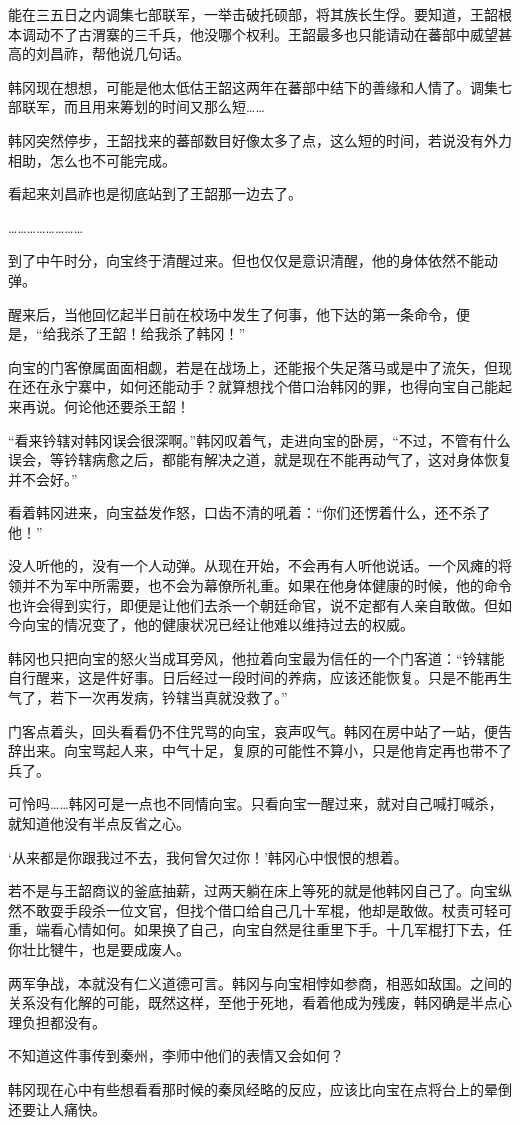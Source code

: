 能在三五日之内调集七部联军，一举击破托硕部，将其族长生俘。要知道，王韶根本调动不了古渭寨的三千兵，他没哪个权利。王韶最多也只能请动在蕃部中威望甚高的刘昌祚，帮他说几句话。

韩冈现在想想，可能是他太低估王韶这两年在蕃部中结下的善缘和人情了。调集七部联军，而且用来筹划的时间又那么短……

韩冈突然停步，王韶找来的蕃部数目好像太多了点，这么短的时间，若说没有外力相助，怎么也不可能完成。

看起来刘昌祚也是彻底站到了王韶那一边去了。

……………………

到了中午时分，向宝终于清醒过来。但也仅仅是意识清醒，他的身体依然不能动弹。

醒来后，当他回忆起半日前在校场中发生了何事，他下达的第一条命令，便是，“给我杀了王韶！给我杀了韩冈！”

向宝的门客僚属面面相觑，若是在战场上，还能报个失足落马或是中了流矢，但现在还在永宁寨中，如何还能动手？就算想找个借口治韩冈的罪，也得向宝自己能起来再说。何论他还要杀王韶！

“看来钤辖对韩冈误会很深啊。”韩冈叹着气，走进向宝的卧房，“不过，不管有什么误会，等钤辖病愈之后，都能有解决之道，就是现在不能再动气了，这对身体恢复并不会好。”

看着韩冈进来，向宝益发作怒，口齿不清的吼着：“你们还愣着什么，还不杀了他！”

没人听他的，没有一个人动弹。从现在开始，不会再有人听他说话。一个风瘫的将领并不为军中所需要，也不会为幕僚所礼重。如果在他身体健康的时候，他的命令也许会得到实行，即便是让他们去杀一个朝廷命官，说不定都有人亲自敢做。但如今向宝的情况变了，他的健康状况已经让他难以维持过去的权威。

韩冈也只把向宝的怒火当成耳旁风，他拉着向宝最为信任的一个门客道：“钤辖能自行醒来，这是件好事。日后经过一段时间的养病，应该还能恢复。只是不能再生气了，若下一次再发病，钤辖当真就没救了。”

门客点着头，回头看看仍不住咒骂的向宝，哀声叹气。韩冈在房中站了一站，便告辞出来。向宝骂起人来，中气十足，复原的可能性不算小，只是他肯定再也带不了兵了。

可怜吗……韩冈可是一点也不同情向宝。只看向宝一醒过来，就对自己喊打喊杀，就知道他没有半点反省之心。

‘从来都是你跟我过不去，我何曾欠过你！’韩冈心中恨恨的想着。

若不是与王韶商议的釜底抽薪，过两天躺在床上等死的就是他韩冈自己了。向宝纵然不敢耍手段杀一位文官，但找个借口给自己几十军棍，他却是敢做。杖责可轻可重，端看心情如何。如果换了自己，向宝自然是往重里下手。十几军棍打下去，任你壮比犍牛，也是要成废人。

两军争战，本就没有仁义道德可言。韩冈与向宝相悖如参商，相恶如敌国。之间的关系没有化解的可能，既然这样，至他于死地，看着他成为残废，韩冈确是半点心理负担都没有。

不知道这件事传到秦州，李师中他们的表情又会如何？

韩冈现在心中有些想看看那时候的秦凤经略的反应，应该比向宝在点将台上的晕倒还要让人痛快。


